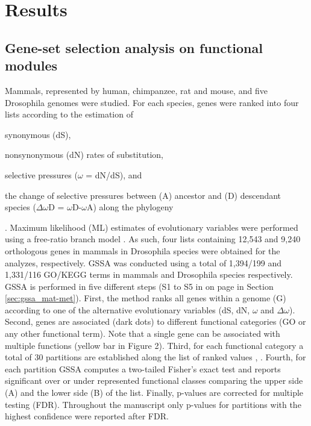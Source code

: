 \section{Results}

\subsection{Gene-set selection analysis on functional modules}

Mammals, represented by human, chimpanzee, rat and mouse, and five Drosophila genomes were studied. For each species, genes were ranked into four lists according to the estimation of \begin{inparaenum}[i\upshape-] \item synonymous (dS), \item nonsynonymous (dN) rates of substitution, \item selective pressures ($\omega$ = dN/dS), and \item the change of selective pressures between (A) ancestor and (D) descendant species ($\Delta\omega$D = $\omega$D-$\omega$A) along the phylogeny \end{inparaenum}. Maximum likelihood (ML) estimates of evolutionary variables were performed using a free-ratio branch model \cite{Yang2007}. As such, four lists containing 12,543 and 9,240 orthologous genes in mammals in Drosophila species were obtained for the analyzes, respectively. GSSA was conducted using a total of 1,394/199 and 1,331/116 GO/KEGG terms in mammals and Drosophila species respectively. GSSA is performed in five different steps (S1 to S5 in  on page \pageref{fig:gssa_met} in Section \ref{sec:gssa_mat-met}). First, the method ranks all genes within a genome (G) according to one of the alternative evolutionary variables (dS, dN, $\omega$ and $\Delta\omega$). Second, genes are associated (dark dots) to different functional categories (GO or any other functional term). Note that a single gene can be associated with multiple functions (yellow bar in Figure 2). Third, for each functional category a total of 30 partitions are established along the list of ranked values \cite{Al-Shahrour2007}, \cite{Al-Shahrour2005a}. Fourth, for each partition GSSA computes a two-tailed Fisher's exact test and reports significant over or under represented functional classes comparing the upper side (A) and the lower side (B) of the list. Finally, p-values are corrected for multiple testing (FDR). Throughout the manuscript only p-values for partitions with the highest confidence were reported after FDR.

